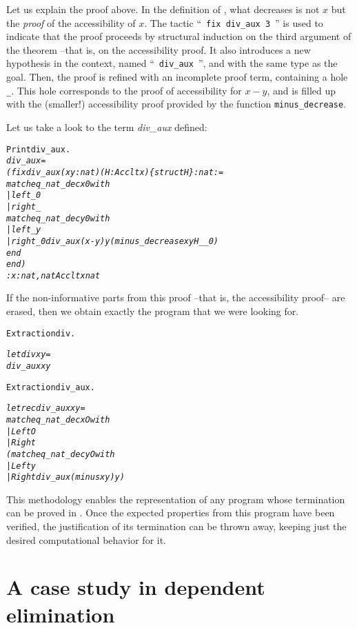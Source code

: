 \documentclass[11pt]{article}
\begin{document}
Let us explain the proof above. In the definition of ,
what decreases is not $x$ but the \textsl{proof} of the accessibility
of $x$. The tactic ``~\texttt{fix div\_aux 3}~'' is used to indicate that the proof
proceeds by structural induction on the third argument of the theorem
--that is, on the accessibility proof. It also introduces a new
hypothesis in the context, named ``~\texttt{div\_aux}~'', and with the
same type as the goal. Then, the proof is refined with an incomplete
proof term, containing a hole \texttt{\_}.  This hole corresponds to the proof
of accessibility for $x-y$, and is filled up with the (smaller!)
accessibility proof provided by the function \texttt{minus\_decrease}. 


\noindent Let us take a look to the term \textsl{div\_aux} defined:

\pagebreak
\begin{alltt}
Print div_aux.
\it
div_aux = 
(fix div_aux (x y : nat) (H : Acc lt x) \{struct H\} : nat :=
   match eq_nat_dec x 0 with
   | left _ {\funarrow} 0
   | right _ {\funarrow}
       match eq_nat_dec y 0 with
       | left _ {\funarrow} y
       | right _0 {\funarrow} div_aux (x - y) y (minus_decrease x y H _ _0)
       end
   end)
     : {\prodsym} x : nat, nat {\arrow} Acc lt x {\arrow} nat

\end{alltt}

If the non-informative parts from this proof --that is, the
accessibility proof-- are erased, then we obtain exactly the program
that we were looking for. 
\begin{alltt}

Extraction div.

\it
let div x y =
  div_aux x y
\tt

Extraction div_aux.

\it
let rec div_aux x y =
  match eq_nat_dec x O with
    | Left {\arrow} O
    | Right {\arrow}
        (match eq_nat_dec y O with
           | Left {\arrow} y
           | Right {\arrow} div_aux (minus x y) y)
\end{alltt}

This methodology enables the representation
of any program whose termination can be proved in {\coq}. Once the
expected properties from this program have been verified, the
justification of its termination can be thrown away, keeping just the
desired computational behavior for it.

\section{A case study in dependent elimination}\label{CaseStudy}
\end{document}
